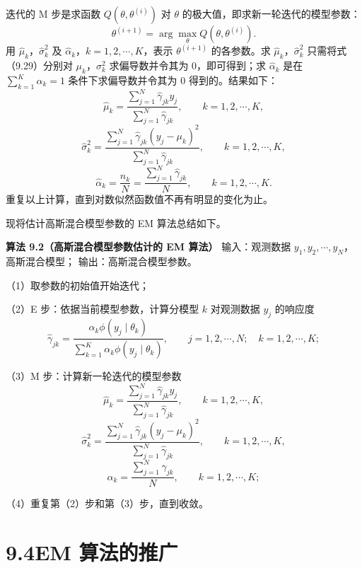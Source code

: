 \documentclass[UTF8,12pt,a4paper,fontset=fandol]{ctexart}
\begin{document}
迭代的 M 步是求函数 $Q(\theta,\theta^{(i)})$ 对 $\theta$ 的极大值，即求新一轮迭代的模型参数：
\[
  \theta^{(i+1)}=\arg\max_{\theta}Q(\theta,\theta^{(i)}).
\]
用 $\hat{\mu}_k$，$\hat{\sigma}_k^2$ 及 $\hat{\alpha}_k$，$k=1,2,\cdots,K$，表示 $\theta^{(i+1)}$ 的各参数。求 $\hat{\mu}_k$，$\hat{\sigma}_k^2$ 只需将式（9.29）分别对 $\mu_k$，$\sigma_k^2$ 求偏导数并令其为 0，即可得到；求 $\hat{\alpha}_k$ 是在 $\sum_{k=1}^K\alpha_k=1$ 条件下求偏导数并令其为 0 得到的。结果如下：
\begin{equation}
  \hat{\mu}_k=
  \frac{\sum_{j=1}^N\hat{\gamma}_{jk}y_j}
  {\sum_{j=1}^N\hat{\gamma}_{jk}},
  \qquad k=1,2,\cdots,K,
  \tag{9.30}
\end{equation}
\begin{equation}
  \hat{\sigma}_k^2=
  \frac{\sum_{j=1}^N\hat{\gamma}_{jk}(y_j-\mu_k)^2}
  {\sum_{j=1}^N\hat{\gamma}_{jk}},
  \qquad k=1,2,\cdots,K,
  \tag{9.31}
\end{equation}
\begin{equation}
  \hat{\alpha}_k=\frac{n_k}{N}
  =\frac{\sum_{j=1}^N\hat{\gamma}_{jk}}{N},
  \qquad k=1,2,\cdots,K.
  \tag{9.32}
\end{equation}
重复以上计算，直到对数似然函数值不再有明显的变化为止。

现将估计高斯混合模型参数的 EM 算法总结如下。

\noindent\textbf{算法 9.2（高斯混合模型参数估计的 EM 算法）}\quad
输入：观测数据 $y_1,y_2,\cdots,y_N$，高斯混合模型；
输出：高斯混合模型参数。

（1）取参数的初始值开始迭代；

（2）E 步：依据当前模型参数，计算分模型 $k$ 对观测数据 $y_j$ 的响应度
\[
  \hat{\gamma}_{jk}=
  \frac{\alpha_k\phi(y_j\mid\theta_k)}
  {\sum_{k=1}^K\alpha_k\phi(y_j\mid\theta_k)},
  \qquad j=1,2,\cdots,N;\quad k=1,2,\cdots,K;
\]

（3）M 步：计算新一轮迭代的模型参数
\[
  \hat{\mu}_k=
  \frac{\sum_{j=1}^N\hat{\gamma}_{jk}y_j}
  {\sum_{j=1}^N\hat{\gamma}_{jk}},
  \qquad k=1,2,\cdots,K,
\]
\[
  \hat{\sigma}_k^2=
  \frac{\sum_{j=1}^N\hat{\gamma}_{jk}(y_j-\mu_k)^2}
  {\sum_{j=1}^N\hat{\gamma}_{jk}},
  \qquad k=1,2,\cdots,K,
\]
\[
  \hat{\alpha}_k=\frac{\sum_{j=1}^N\hat{\gamma}_{jk}}{N},
  \qquad k=1,2,\cdots,K;
\]

（4）重复第（2）步和第（3）步，直到收敛。

\section*{9.4\quad EM 算法的推广}
\end{document}
